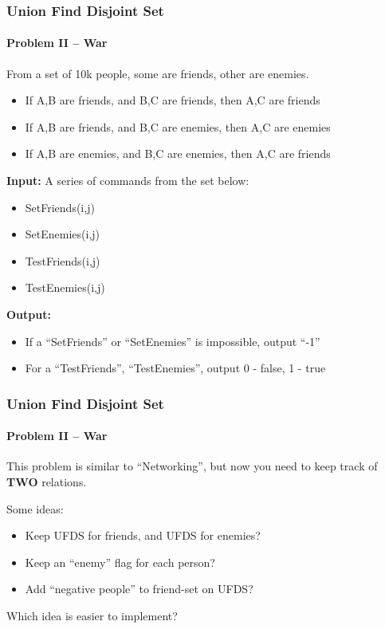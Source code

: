 \documentclass{beamer}
\begin{document}
\begin{frame}
  \frametitle{Union Find Disjoint Set}
  \framesubtitle{Problem II -- War}
  {\small
  \begin{block}{}
    From a set of 10k people, some are friends, other are enemies.
    \begin{itemize}
      \item If A,B are friends, and B,C are friends, then A,C are friends
      \item If A,B are friends, and B,C are enemies, then A,C are enemies
      \item If A,B are enemies, and B,C are enemies, then A,C are friends
    \end{itemize}

    {\bf Input:} A series of commands from the set below:
    \begin{itemize}
    \item SetFriends(i,j)
    \item SetEnemies(i,j)
    \item TestFriends(i,j)
    \item TestEnemies(i,j)
    \end{itemize}

    {\bf Output:}
    \begin{itemize}
    \item If a ``SetFriends'' or ``SetEnemies'' is impossible, output ``-1''
    \item For a ``TestFriends'', ``TestEnemies'', output 0 - false, 1 - true
    \end{itemize}    
  \end{block}}
  
\end{frame}

\begin{frame}
  \frametitle{Union Find Disjoint Set}
  \framesubtitle{Problem II -- War}

  This problem is similar to ``Networking'', but now you need to keep
  track of {\bf TWO} relations.

  \bigskip

  Some ideas:
  \begin{itemize}
  \item Keep UFDS for friends, and UFDS for enemies?
  \item Keep an ``enemy'' flag for each person?
  \item Add ``negative people'' to friend-set on UFDS?
  \end{itemize}

  \bigskip

  Which idea is easier to implement? 
\end{frame}
\end{document}
